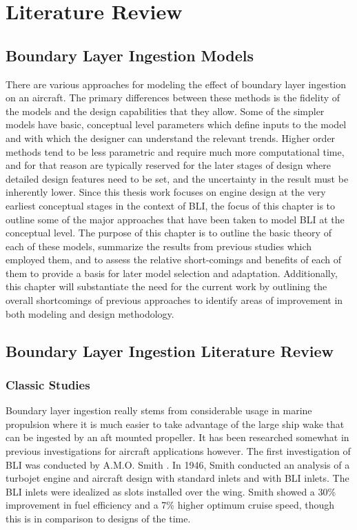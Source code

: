 \chapter{Literature Review}

\section{Boundary Layer Ingestion Models}

There are various approaches for modeling the effect of boundary layer ingestion on an aircraft.  The primary differences between these methods is the fidelity of the models and the design capabilities that they allow.  Some of the simpler models have basic, conceptual level parameters which define inputs to the model and with which the designer can understand the relevant trends.  Higher order methods tend to be less parametric and require much more computational time, and for that reason are typically reserved for the later stages of design where detailed design features need to be set, and the uncertainty in the result must be inherently lower.  Since this thesis work focuses on engine design at the very earliest conceptual stages in the context of BLI, the focus of this chapter is to outline some of the major approaches that have been taken to model BLI at the conceptual level.  The purpose of this chapter is to outline the basic theory of each of these models, summarize the results from previous studies which employed them, and to assess the relative short-comings and benefits of each of them to provide a basis for later model selection and adaptation.  Additionally, this chapter will substantiate the need for the current work by outlining the overall shortcomings of previous approaches to identify areas of improvement in both modeling and design methodology.

\section{Boundary Layer Ingestion Literature Review}
\subsection{Classic Studies}
Boundary layer ingestion really stems from considerable usage in marine propulsion where it is much easier to take advantage of the large ship wake that can be ingested by an aft mounted propeller.  It has been researched somewhat in previous investigations for aircraft applications however.  The first investigation of BLI was conducted by A.M.O. Smith \cite{Smith1947}.  In 1946, Smith conducted an analysis of a turbojet engine and aircraft design with standard inlets and with BLI inlets. The BLI inlets were idealized as slots installed over the wing.  Smith showed a 30\% improvement in fuel efficiency and a 7\% higher optimum cruise speed, though this is in comparison to designs of the time.


